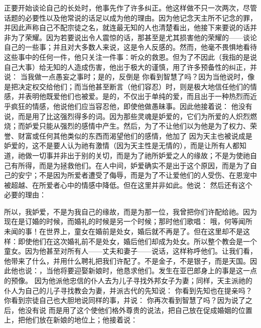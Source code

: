 正要开始谈论自己的长处时，他事先作了许多纠正。他这样做不只一次两次，尽管话题的必要性以及他常说的话足以成为他的理由。因为他记念天主所不记念的罪，并因此声称自己不配宗徒之名，就连最无知的人也清楚看出，他接下来要说的话并非为了荣耀。因为若要说出令人震惊的话，那甚至是尤其损害他的荣耀的——谈论自己的一些事；并且对大多数人来说，这是令人反感的。然而，他毫不畏惧地看待这些事中的任何一件，他只关注一件事：听众的救恩。但为了不因此（我指的是说自己大事）给无知的人造成伤害，他出于极大的谨慎，用了许多预备性的纠正，并说： 当我做一点愚妄之事时；是的，反倒是 你看到智慧了吗？因为当他说时，像是把决定权交给他们；而当他甚至断言（他们容忍）时，则是极大地信任他们的情感，并表明他既爱他们也被爱。是的，不仅出于单纯的爱，而且出于一种热烈而近乎疯狂的情感，他说他们应当容忍他，即使他做愚昧事。因此他接着说： 他没有说，而是用了比这强烈得多的词。因为那些灵魂是妒爱的，它们为所爱的人炽烈燃烧；而妒爱只能从强烈的感情中产生。然后，为了不让他们以为他是为了权力、荣誉、财富或任何其他类似的东西而渴望他们的感情，他加了 因为天主也被说成是妒爱的，这不是要人认为祂有激情（因为天主性是无情的），而是让所有人都知道，祂做一切事并非出于别的关切，而是为了祂所妒爱之人的缘故；不是为使祂自己有所得，而是为拯救他们。在人中间，妒爱确实不是出于这个原因，而是为了自己的安宁；不是因为所爱者遭受了侮辱，而是为了不让爱他们的人受伤、在恩宠中被超越、在所爱者心中的情感中降低。但在这里并非如此。他说： 然后还有这个必要的理由：\par

\newline{} 所以，我妒爱，不是为我自己的缘故，而是为那一位，我曾把你们许配给祂。因为现在是订婚的时候，而婚礼的时候是另一个时候；那时他们歌唱： 哦，何等闻所未闻的事！在世界上，童女在婚前是处女，婚后就不再是了。但在这里却不是这样：即使他们在这次婚礼前不是处女，婚后他们却成为处女。所以整个教会是一个童女。因为他甚至对所有人——丈夫和妻子——说话，这样称呼他们。让我们看，他带来了什么，并用什么聘礼把我们许配了。不是金子，不是银子，而是天国。因此他也说：，当他将要迎娶新娘时，他恳求他们。发生在亚巴郎身上的事是这一点的预像。 因为他派他忠信的仆人去为儿子寻找外邦女子为妻；同样，天主派祂的仆人为自己的儿子寻找教会为妻，并派古代的先知说： 你看到先知也在提亲吗？你看到宗徒自己也大胆地说同样的事，并说： 你再次看到智慧了吗？因为说了之后，他没有说 而是用了这个使他们格外尊贵的说法，把自己放在促成婚姻的位置上，把他们放在新娘的地位上；他接着说：\par

